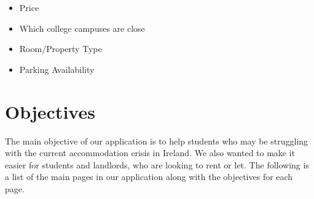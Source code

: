 \begin{itemize}
  \item Price
  \item Which college campuses are close
  \item Room/Property Type
  \item Parking Availability
\end{itemize}

\section{Objectives} \label{objectives}
The main objective of our application is to help students who may be struggling with the current accommodation crisis in Ireland. We also wanted to make it easier for students and landlords, who are looking to rent or let. The following is a list of the main pages in our application along with the objectives for each page. 

